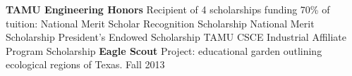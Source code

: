 \documentclass[12pt]{article}
\begin{document}
\begin{flushleft}
\begin{outline}[compactitem]
        \vspace{.25em}
        \1 \textbf{TAMU Engineering Honors}
        \1 Recipient of 4 scholarships funding 70\% of tuition:
        \2 National Merit Scholar Recognition Scholarship
        \2 National Merit Scholarship
        \2 President's Endowed Scholarship
        \2 TAMU CSCE Industrial Affiliate Program Scholarship
        \vspace{.25em}
        \1 \textbf{Eagle Scout} Project: educational garden outlining ecological regions of Texas. \hfill Fall 2013

    \end{outline}
\end{flushleft}
\end{document}
